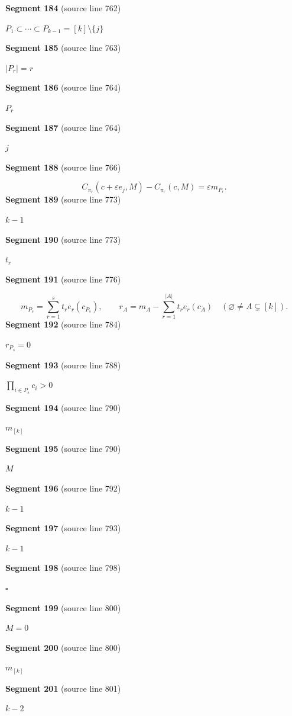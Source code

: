 \documentclass[11pt]{article}
\begin{document}
\textbf{Segment 184} (source line 762)\par
\( P_1\subset\cdots\subset P_{k-1}=[k]\setminus\{j\} \)\par
\textbf{Segment 185} (source line 763)\par
\( |P_r|=r \)\par
\textbf{Segment 186} (source line 764)\par
\( P_r \)\par
\textbf{Segment 187} (source line 764)\par
\( j \)\par
\textbf{Segment 188} (source line 766)\par
\[
C_{\pi_r}(c+\varepsilon e_j,M)-C_{\pi_r}(c,M)
 =\varepsilon m_{P_r}.
\tag{14}
\]
\textbf{Segment 189} (source line 773)\par
\( k-1 \)\par
\textbf{Segment 190} (source line 773)\par
\( t_r \)\par
\textbf{Segment 191} (source line 776)\par
\[
m_{P_s}=\sum_{r=1}^s t_r e_r(c_{P_s}),
\qquad
r_A=m_A-\sum_{r=1}^{|A|}t_r e_r(c_A)
\quad(\varnothing\ne A\subsetneq[k]).
\]
\textbf{Segment 192} (source line 784)\par
\( r_{P_s}=0 \)\par
\textbf{Segment 193} (source line 788)\par
\( \prod_{i\in P_s}c_i>0 \)\par
\textbf{Segment 194} (source line 790)\par
\( m_{[k]} \)\par
\textbf{Segment 195} (source line 790)\par
\( M \)\par
\textbf{Segment 196} (source line 792)\par
\( k-1 \)\par
\textbf{Segment 197} (source line 793)\par
\( k-1 \)\par
\textbf{Segment 198} (source line 798)\par
\( \square \)\par
\textbf{Segment 199} (source line 800)\par
\( M=0 \)\par
\textbf{Segment 200} (source line 800)\par
\( m_{[k]} \)\par
\textbf{Segment 201} (source line 801)\par
\( k-2 \)\par
\end{document}
